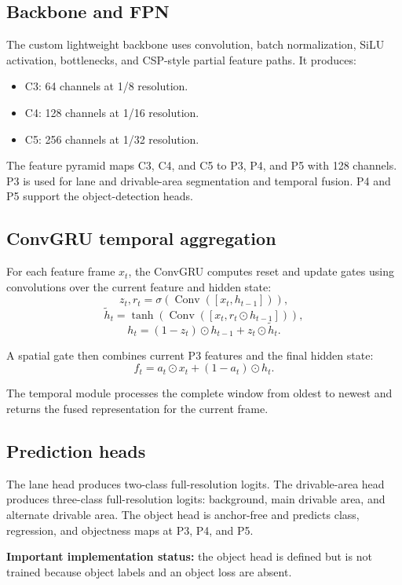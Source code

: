 \documentclass[11pt,a4paper]{article}
\begin{document}
\subsection{Backbone and FPN}
The custom lightweight backbone uses convolution, batch normalization, SiLU activation, bottlenecks, and CSP-style partial feature paths. It produces:

\begin{itemize}
\item C3: 64 channels at 1/8 resolution.
\item C4: 128 channels at 1/16 resolution.
\item C5: 256 channels at 1/32 resolution.
\end{itemize}

The feature pyramid maps C3, C4, and C5 to P3, P4, and P5 with 128 channels. P3 is used for lane and drivable-area segmentation and temporal fusion. P4 and P5 support the object-detection heads.

\subsection{ConvGRU temporal aggregation}
For each feature frame $x_t$, the ConvGRU computes reset and update gates using convolutions over the current feature and hidden state:
\[
z_t, r_t = \sigma(\operatorname{Conv}([x_t,h_{t-1}])),
\]
\[
\tilde{h}_t = \tanh(\operatorname{Conv}([x_t,r_t \odot h_{t-1}])),
\]
\[
h_t=(1-z_t)\odot h_{t-1}+z_t\odot\tilde{h}_t.
\]

A spatial gate then combines current P3 features and the final hidden state:
\[
f_t=a_t\odot x_t+(1-a_t)\odot h_t.
\]

The temporal module processes the complete window from oldest to newest and returns the fused representation for the current frame.

\subsection{Prediction heads}
The lane head produces two-class full-resolution logits. The drivable-area head produces three-class full-resolution logits: background, main drivable area, and alternate drivable area. The object head is anchor-free and predicts class, regression, and objectness maps at P3, P4, and P5.

\textbf{Important implementation status:} the object head is defined but is not trained because object labels and an object loss are absent.
\end{document}

